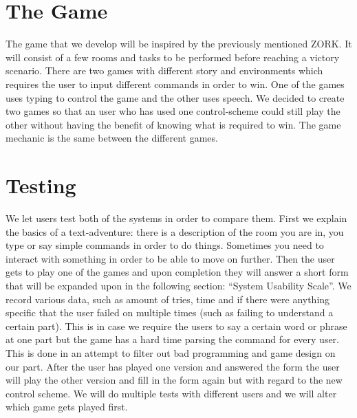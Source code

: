 \section{The Game}
The game that we develop will be inspired by the previously mentioned ZORK. It will consist of a few rooms and tasks to be performed before reaching a victory scenario. There are two games with different story and environments which requires the user to input different commands in order to win. One of the games uses typing to control the game and the other uses speech. We decided to create two games so that an user who has used one control-scheme could still play the other without having the benefit of knowing what is required to win. The game mechanic is the same between the different games.

\section{Testing} 
We let users test both of the systems in order to compare them. First we explain the basics of a text-adventure: there is a description of the room you are in, you type or say simple commands in order to do things. Sometimes you need to interact with something in order to be able to move on further. Then the user gets to play one of the games and upon completion they will answer a short form that will be expanded upon in the following section: ``System Usability Scale''. We record various data, such as amount of tries, time and if there were anything specific that the user failed on multiple times (such as failing to understand a certain part). This is in case we require the users to say a certain word or phrase at one part but the game has a hard time parsing the command for every user. This is done in an attempt to filter out bad programming and game design on our part. 
After the user has played one version and answered the form the user will play the other version and fill in the form again but with regard to the new control scheme. We will do multiple tests with different users and we will alter which game gets played first.

